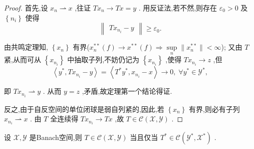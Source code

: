 \documentclass[lang=cn,newtx,10pt,scheme=chinese,thmcnt=chapter]{elegantbook}
\begin{document}
\begin{proof}
    首先,设 \({x}_{n} \rightharpoonup  x\) ,往证 \(T{x}_{n} \rightarrow  {Tx} = y\) . 用反证法,若不然,则存在 \({\varepsilon }_{0} > 0\) 及 \(\left\{  {n}_{i}\right\}\) 使得
\begin{equation*}
\begin{Vmatrix}{T{x}_{{n}_{i}} - y}\end{Vmatrix} \geq  {\varepsilon }_{0}.
\end{equation*}

由共鸣定理知, \(\left\{  {x}_{n}\right\}\) 有界($x_n^{**}(f)\to x^{**}(f)\Rightarrow \sup\limits_n\|x_n^{**}\|<\infty$); 又由 \(T\) 紧,从而可从 \(\left\{  {x}_{{n}_{i}}\right\}\) 中抽取子列,不妨仍记为 \(\left\{  {x}_{{n}_{i}}\right\}\) ,使得 \(T{x}_{{n}_{i}} \rightarrow  z\) ,但
\begin{equation*}
\left\langle  {{y}^{ * },T{x}_{{n}_{i}} - y}\right\rangle   = \left\langle  {{T}^{ * }{y}^{ * },{x}_{{n}_{i}} - x}\right\rangle   \rightarrow  0,\;\forall {y}^{ * } \in  {\mathcal{Y}}^{ * },
\end{equation*}

即 \(T{x}_{{n}_{i}} \rightharpoonup  y\) . 从而 \(y = z\) ,矛盾,故定理第一个结论得证.

反之,由于自反空间的单位闭球是弱自列紧的,因此,若 \(\left\{  {x}_{n}\right\}\) 有界,则必有子列 \({x}_{{n}_{i}} \rightharpoonup  x\) . 由 \(T\) 全连续得 \(T{x}_{{n}_{i}} \rightarrow  {Tx}\) ,故 \(T \in  \mathcal{C}\left( {\mathcal{X},\mathcal{Y}}\right)\) .

\end{proof}
\begin{theorem}
    设 \(\mathcal{X},\mathcal{Y}\) 是Banach空间,则 \(T \in  \mathcal{C}\left( {\mathcal{X},\mathcal{Y}}\right)\) 当且仅当 \({T}^{ * } \in  \mathcal{C}\left( {{\mathcal{Y}}^{ * },{\mathcal{X}}^{ * }}\right)\) .
\end{theorem}
\end{document}
